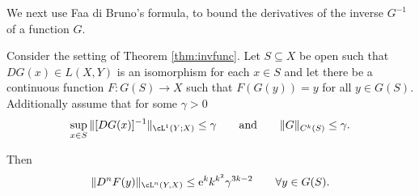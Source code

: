 We next use Faa di Bruno's formula, to bound the derivatives of the
inverse $G^{-1}$ of a function $G$.
\begin{proposition}\label{prop:NormInverse}
  Consider the setting of Theorem \ref{thm:invfunc}. Let
  $S\subseteq X$ be open such that $DG(x)\in L(X,Y)$ is an isomorphism
  for each $x\in S$ and let there be a continuous function
  $F:G(S)\to X$ such that $F(G(y))=y$ for all $y\in
  G(S)$. Additionally assume that for some $\gamma>0$
  \begin{equation}\label{eq:gammaass}
    \sup_{x\in S}\|[DG(x)]^{-1}\|_{\cL^1(Y;X)} \le\gamma\qquad\text{and}\qquad
    \|G\|_{C^k(S)}\le\gamma.
  \end{equation}

  Then %
  \begin{equation}\label{eq:NormInverse}
    \|D^nF(y)\|_{\cL^n(Y,X)}\le \e^kk^{k^2}\gamma^{3k-2}
    \qquad\forall y\in G(S). 
  \end{equation}
\end{proposition}
